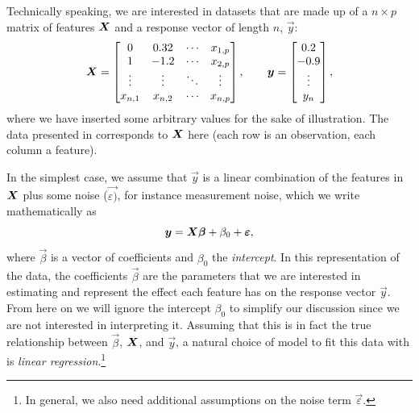 Technically speaking, we are interested in datasets that are made up of a \(n \times p\) matrix of features \(\boldsymbol{X}\) and a response vector of length \(n\), \(\vec{y}\):
\[
  \boldsymbol{X} = \begin{bmatrix}
    0       & 0.32    & \cdots & x_{1,p} \\
    1       & -1.2    & \cdots & x_{2,p} \\
    \vdots  & \vdots  & \ddots & \vdots  \\
    x_{n,1} & x_{n,2} & \cdots & x_{n,p} \\
  \end{bmatrix},\qquad
  \boldsymbol{y} = \begin{bmatrix}0.2 \\ -0.9 \\ \vdots \\ y_n\end{bmatrix},
\]
where we have inserted some arbitrary values for the sake of illustration. The data presented in  corresponds to \(\boldsymbol{X}\) here (each row is an observation, each column a feature).

In the simplest case, we assume that \(\vec{y}\) is a linear combination of the features in \(\boldsymbol{X}\) plus some noise (\(\vec{\varepsilon)}\), for instance measurement noise, which we write mathematically as
\[
  \boldsymbol{y} = \boldsymbol{X}\boldsymbol{\beta} + \beta_0 + \boldsymbol{\varepsilon},
\]
where \(\vec{\beta}\) is a vector of coefficients and \(\beta_0\) the \emph{intercept}. In this representation of the data, the coefficients \(\vec{\beta}\) are the parameters that we are interested in estimating and represent the effect each feature has on the response vector \(\vec{y}\). From here on we will ignore the intercept \(\beta_0\) to simplify our discussion since we are not interested in interpreting it.
Assuming that this is in fact the true relationship between \(\vec{\beta}\), \(\boldsymbol{X}\), and \(\vec{y}\), a natural choice of model to fit this data with is \emph{linear regression}.\footnote{In general, we also need additional assumptions on the noise term \(\vec{\varepsilon}\).}

